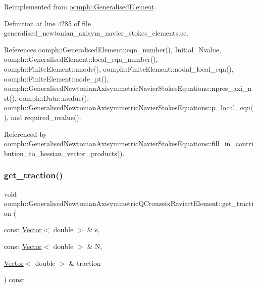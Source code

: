 Reimplemented from \hyperlink{classoomph_1_1GeneralisedElement_a069f59bfc3e607a5bebba52c6314d777}{oomph\+::\+Generalised\+Element}.



Definition at line 4285 of file generalised\+\_\+newtonian\+\_\+axisym\+\_\+navier\+\_\+stokes\+\_\+elements.\+cc.



References oomph\+::\+Generalised\+Element\+::eqn\+\_\+number(), Initial\+\_\+\+Nvalue, oomph\+::\+Generalised\+Element\+::local\+\_\+eqn\+\_\+number(), oomph\+::\+Finite\+Element\+::nnode(), oomph\+::\+Finite\+Element\+::nodal\+\_\+local\+\_\+eqn(), oomph\+::\+Finite\+Element\+::node\+\_\+pt(), oomph\+::\+Generalised\+Newtonian\+Axisymmetric\+Navier\+Stokes\+Equations\+::npres\+\_\+axi\+\_\+nst(), oomph\+::\+Data\+::nvalue(), oomph\+::\+Generalised\+Newtonian\+Axisymmetric\+Navier\+Stokes\+Equations\+::p\+\_\+local\+\_\+eqn(), and required\+\_\+nvalue().



Referenced by oomph\+::\+Generalised\+Newtonian\+Axisymmetric\+Navier\+Stokes\+Equations\+::fill\+\_\+in\+\_\+contribution\+\_\+to\+\_\+hessian\+\_\+vector\+\_\+products().

\mbox{\label{classoomph_1_1GeneralisedNewtonianAxisymmetricQCrouzeixRaviartElement_a1e70570e27e18c482df95595136876df}} 
\subsubsection{\texorpdfstring{get\+\_\+traction()}{get\_traction()}}
{\footnotesize\ttfamily void oomph\+::\+Generalised\+Newtonian\+Axisymmetric\+Q\+Crouzeix\+Raviart\+Element\+::get\+\_\+traction (\begin{DoxyParamCaption}\item[{const \hyperlink{classoomph_1_1Vector}{Vector}$<$ double $>$ \&}]{s,  }\item[{const \hyperlink{classoomph_1_1Vector}{Vector}$<$ double $>$ \&}]{N,  }\item[{\hyperlink{classoomph_1_1Vector}{Vector}$<$ double $>$ \&}]{traction }\end{DoxyParamCaption}) const}



